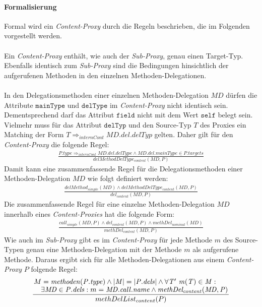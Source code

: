 \documentclass[a4paper,12pt]{article}
\begin{document}
\paragraph{Formalisierung}
Formal wird ein \emph{Content-Proxy} durch die Regeln beschrieben, die im Folgenden vorgestellt werden.\\\\
Ein \emph{Content-Proxy} enthält, wie auch der \emph{Sub-Proxy}, genau einen Target-Typ. Ebenfalls identisch zum \emph{Sub-Proxy} sind die Bedingungen hinsichtlich der aufgerufenen Methoden in den einzelnen Methoden-Delegationen.\\\\
In den Delegationsmethoden einer einzelnen Methoden-Delegation $\mathit{MD}$ dürfen die Attribute $\texttt{mainType}$ und $\texttt{delType}$ im \emph{Content-Proxy} nicht identisch sein. Dementsprechend darf das Attribut $\texttt{field}$ nicht mit dem Wert $\texttt{self}$ belegt sein. Vielmehr muss für das Attribut $\texttt{delTyp}$ und den Source-Typ $T$ des Proxies ein Matching der Form $T \Rightarrow_{internCont} \mathit{MD.del.delTyp}$ gelten. Daher gilt für den \emph{Content-Proxy} die folgende Regel:
\begin{gather*}
\frac{\mathit{P.type} \Rightarrow_{internCont} \mathit{MD.del.delType}  \wedge \mathit{MD.del.mainType} \in \mathit{P.targets}}
{\mathit{delMethodDelType_{content}(MD,P)}}
\end{gather*}
\noindent
Damit kann eine zusammenfassende Regel für die Delegationsmethoden einer Methoden-Delegation $\mathit{MD}$ wie folgt definiert werden:
\begin{gather*}
\frac{\mathit{delMethod_{simple}(MD)} \wedge \mathit{delMethodDelType_{content}(MD,P)}}
{\mathit{del_{content}(MD,P)}}
\end{gather*}
Die zusammenfassende Regel für eine einzelne Methoden-Delegation $\mathit{MD}$ innerhalb eines \emph{Content-Proxies} hat die folgende Form:
\begin{gather*}
\frac{\mathit{call_{simple}(MD,P)} \wedge \mathit{del_{content}(MD,P) \wedge \mathit{methDel_{nominal}(MD)}}}
{\mathit{methDel_{content}(MD,P)}}
\end{gather*}
Wie auch im \emph{Sub-Proxy} gibt es im \emph{Content-Proxy} für jede Methode $m$ des Source-Typen genau eine Methoden-Delegation mit der Methode $m$ als aufgerufene Methode. Daraus ergibt sich für alle Methoden-Delegationen aus einem \emph{Content-Proxy} $P$ folgende Regel:
\begin{gather*}
\frac{\splitfrac{M = \mathit{methoden(P.type) }\wedge|\mathit{M}| = |\mathit{P.dels}| \wedge \forall \mathit{T' \text{ }m(T)} \in \mathit{M}:}{ \exists \mathit{MD} \in \mathit{P.dels}:m = \mathit{MD.call.name} \wedge \mathit{methDel_{content}(MD,P)
 }
}}
{methDelList_{content}(P)}
\end{gather*}
\end{document}
